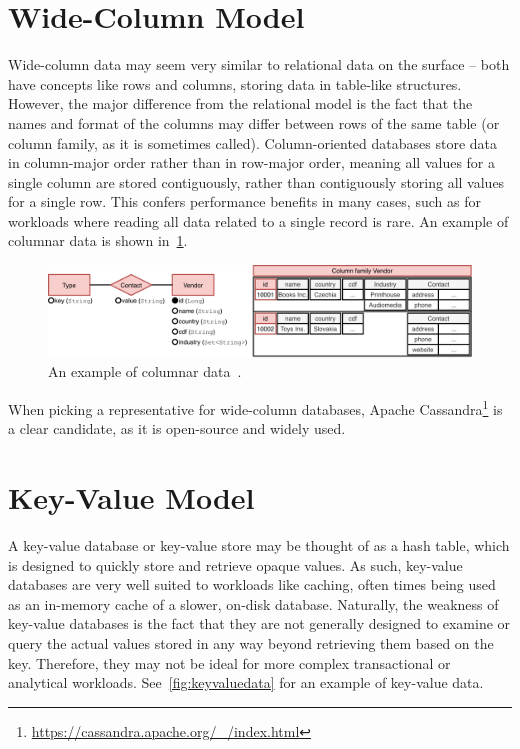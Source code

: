 \section{Wide-Column Model}

Wide-column data may seem very similar to relational data on the surface -- both have concepts like rows and columns, storing data in table-like structures.
However, the major difference from the relational model is the fact that the names and format of the columns may differ between rows of the same table (or column family, as it is sometimes called).
Column-oriented databases store data in column-major order rather than in row-major order, meaning all values for a single column are stored contiguously, rather than contiguously storing all values for a single row.
This confers performance benefits in many cases, such as for workloads where reading all data related to a single record is rare.
An example of columnar data is shown in~\cref{fig:columnardata}.

\begin{figure}[hb]
\centering
\includegraphics[scale=0.66]{img/example-columnar.pdf}
\caption{An example of columnar data~\cite{inference}.}
\label{fig:columnardata}
\end{figure}

When picking a representative for wide-column databases, Apache Cassandra\footnote{\url{https://cassandra.apache.org/_/index.html}} is a clear candidate, as it is open-source and widely used.

\section{Key-Value Model}

A key-value database or key-value store may be thought of as a hash table, which is designed to quickly store and retrieve opaque values.
As such, key-value databases are very well suited to workloads like caching, often times being used as an in-memory cache of a slower, on-disk database.
Naturally, the weakness of key-value databases is the fact that they are not generally designed to examine or query the actual values stored in any way beyond retrieving them based on the key.
Therefore, they may not be ideal for more complex transactional or analytical workloads.
See~\cref{fig:keyvaluedata} for an example of key-value data.

